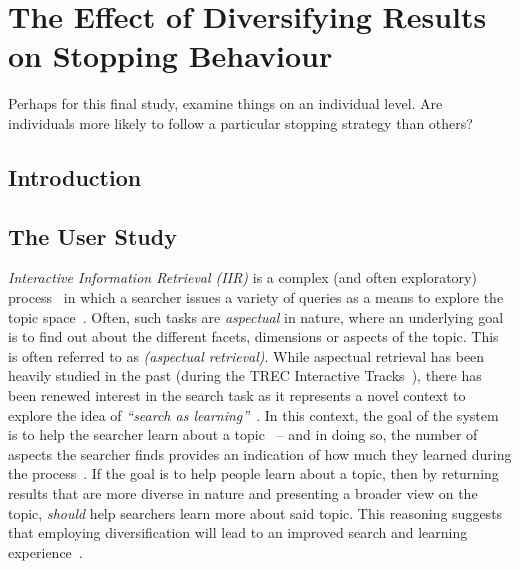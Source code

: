 
\chapter{The Effect of Diversifying Results on Stopping Behaviour}
Perhaps for this final study, examine things on an individual level. Are individuals more likely to follow a particular stopping strategy than others?
\section{Introduction}

\section{The User Study}
\emph{Interactive Information Retrieval (IIR)} is a complex (and often exploratory) process~\cite{ingwersen2005theturn} in which a searcher issues a variety of queries as a means to explore the topic space~\cite{kelly2015search_tasks}. Often, such tasks are \emph{aspectual} in nature, where an underlying goal is to find out about the different facets, dimensions or aspects of the topic. This is often referred to as \emph{(aspectual retrieval)}. While aspectual retrieval has been heavily studied in the past (during the TREC Interactive Tracks~\cite{over2001trec}), there has been renewed interest in the search task as it represents a novel context to explore the idea of \emph{``search as learning''}~\cite{collins2017sal}. In this context, the goal of the system is to help the searcher learn about a topic~\cite{collins2017sal} -- and in doing so, the number of aspects the searcher finds provides an indication of how much they learned during the process~\cite{syed2017sal}. If the goal is to help people learn about a topic, then by returning results that are more diverse in nature and presenting a broader view on the topic, \emph{should} help searchers learn more about said topic. This reasoning suggests that employing diversification will lead to an improved search and learning experience~\cite{syed2017sal}. 

